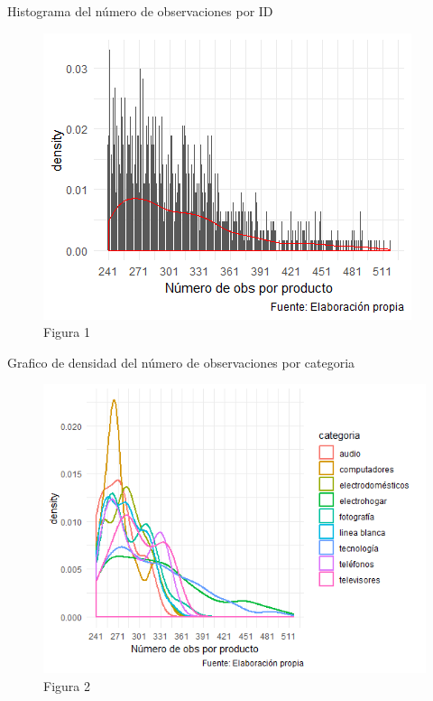 \documentclass[xcolor=dvipsnames]{beamer}
\begin{document}
\begin{frame}
Histograma del n\'umero de observaciones por ID
\begin{figure}
\includegraphics[scale=0.75]{observaciones_producto.png}
\caption{Figura 1}
\end{figure}
\end{frame}

\begin{frame}
Grafico de densidad del n\'umero de observaciones por categoria
\begin{figure}
\includegraphics[scale=0.60]{observaciones_categoria.png}
\caption{Figura 2}
\end{figure}
\end{frame}
\end{document}
